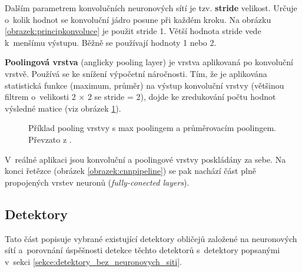 Dalším parametrem konvolučních neuronových sítí je tzv. \textbf{stride} velikost. Určuje o~kolik hodnot se konvoluční jádro posune při každém kroku. Na obrázku \ref{obrazek:principkonvoluce} je použit stride 1. Větší hodnota stride vede k~menšímu výstupu. Běžně se používají hodnoty 1 nebo 2.

\textbf{Poolingová vrstva} (anglicky pooling layer) je vrstva aplikovaná po konvoluční vrstvě. Používá se ke snížení výpočetní náročnosti. Tím, že je aplikována statistická funkce (maximum, průměr) na výstup konvoluční vrstvy (většinou filtrem o~velikosti 2 $\times$ 2 se stride = 2), dojde ke zredukování počtu hodnot výsledné matice (viz obrázek \ref{obrazek:cnnpooling}).

\begin{figure}[H]
  \begin{center}
  \label{obrazek:cnnpooling}
  \caption{Příklad pooling vrstvy s max poolingem a průměrovacím poolingem. Převzato z \cite{cnnCv}.}
  \end{center}
\end{figure}

V~reálné aplikaci jsou konvoluční a poolingové vrstvy poskládány za sebe. Na konci řetězce (obrázek \ref{obrazek:cnnpipeline}) se pak nachází část plně propojených vrstev neuronů (\emph{fully-conected layers}).

\subsection*{Detektory}
Tato část popisuje vybrané existující detektory obličejů založené na neuronových sítí a~porovnání úspěšnosti detekce těchto detektorů s~detektory popsanými v~sekci \ref{sekce:detektory_bez_neuronovych_siti}.

